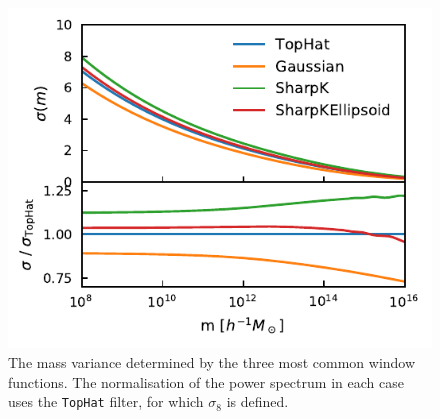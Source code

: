 \documentclass[5p,aas_macros]{elsarticle}
\begin{document}
\begin{figure}
  \centering
  \includegraphics[width=\linewidth]{filter_models.pdf}
  \caption[Mass variance using three different filters]{The mass variance determined by the three most common window functions. The normalisation of the power spectrum in each case uses the \texttt{TopHat} filter, for which $\sigma_8$ is defined.}
  \label{fig:filter_sigma}
\end{figure}


\end{document}
